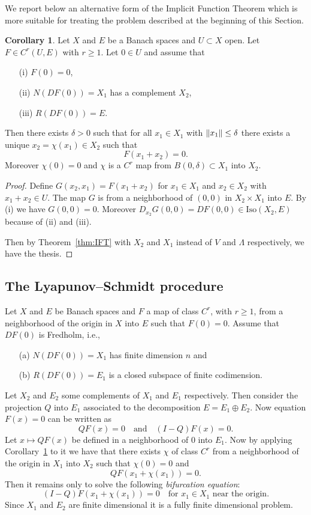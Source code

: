 \documentclass[a4paper,11pt]{article}
\theoremstyle{definition}
\newtheorem{cor}[prop]{Corollary}
\DeclarePairedDelimiter{\norm}{\lVert}{\rVert}
\begin{document}
We report below an alternative form of the Implicit Function Theorem which is more suitable for treating the problem described at the beginning of this Section.
\begin{cor}
\label{cor:alt-IFT}
Let $X$ and $E$ be a Banach spaces and $U\subset X$ open. Let $F\in C^r(U,E)$ with $r\ge1$. Let $0\in U$ and assume that
\begin{itemize}
\item[(i)] $F(0)=0$,
\item[(ii)] $N(DF(0))=X_1$ has a complement $X_2$,
\item[(iii)] $R(DF(0))=E$.
\end{itemize}
Then there exists $\delta>0$ such that for all $x_1\in X_1$ with $\norm{x_1}\le\delta$ there exists a unique $x_2=\chi(x_1)\in X_2$ such that
\[
F(x_1+x_2)=0.
\]
Moreover $\chi(0)=0$ and $\chi$ is a $C^r$ map from $B(0,\delta)\subset X_1$ into $X_2$.
\end{cor}
\begin{proof}
Define $G(x_2,x_1)=F(x_1+x_2)$ for $x_1\in X_1$ and $x_2\in X_2$ with $x_1+x_2\in U$. The map $G$ is from a neighborhood of $(0,0)$ in $X_2\times X_1$ into $E$. By (i) we have $G(0,0)=0$. Moreover $D_{x_2}G(0,0)=DF(0,0)\in\text{Iso}(X_2,E)$ because of (ii) and (iii).

Then by Theorem~\ref{thm:IFT} with $X_2$ and $X_1$ instead of $V$ and $\Lambda$ respectively, we have the thesis.
\end{proof}

\subsection{The Lyapunov--Schmidt procedure}

Let $X$ and $E$ be Banach spaces and $F$ a map of class $C^r$, with $r\ge1$, from a neighborhood of the origin in $X$ into $E$ such that $F(0)=0$. Assume that $DF(0)$ is Fredholm, i.e.,
\begin{itemize}
\item[(a)] $N(DF(0))=X_1$ has finite dimension $n$ and
\item[(b)] $R(DF(0))=E_1$ is a closed subspace of finite codimension.
\end{itemize}
Let $X_2$ and $E_2$ some complements of $X_1$ and $E_1$ respectively. Then consider the projection $Q$ into $E_1$ associated to the decomposition $E=E_1\oplus E_2$. Now equation $F(x)=0$ can be written as
\[
QF(x)=0\quad\text{and}\quad (I-Q)F(x)=0.
\]
Let $x\mapsto QF(x)$ be defined in a neighborhood of $0$ into $E_1$. Now by applying Corollary~\ref{cor:alt-IFT} to it we have that there exists $\chi$ of class $C^r$ from a neighborhood of the origin in $X_1$ into $X_2$ such that $\chi(0)=0$ and
\[
QF(x_1+\chi(x_1))=0.
\]
Then it remains only to solve the following \emph{bifurcation equation}:
\begin{equation}
\label{eqn:finite-dim}
(I-Q)F(x_1+\chi(x_1))=0\quad\text{for $x_1\in X_1$ near the origin}.
\end{equation}
Since $X_1$ and $E_2$ are finite dimensional it is a fully finite dimensional problem.
\end{document}
